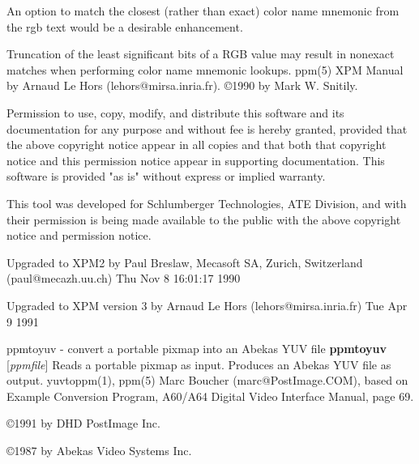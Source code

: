 An option to match the closest (rather than exact) color name mnemonic
from the rgb text would be a desirable enhancement.
\par
Truncation of the least significant bits of a RGB value may result in
nonexact matches when performing color name mnemonic lookups.
ppm(5)
\nwl
XPM Manual by Arnaud Le Hors (lehors@mirsa.inria.fr).
\copyright 1990 by Mark W. Snitily.

Permission to use, copy, modify, and distribute this software and its
documentation for any purpose and without fee is hereby granted, provided
that the above copyright notice appear in all copies and that both that
copyright notice and this permission notice appear in supporting
documentation.  This software is provided "as is" without express or
implied warranty.

This tool was developed for Schlumberger Technologies, ATE Division, and
with their permission is being made available to the public with the above
copyright notice and permission notice.

Upgraded to XPM2 by
   Paul Breslaw, Mecasoft SA, Zurich, Switzerland (paul@mecazh.uu.ch)
   Thu Nov  8 16:01:17 1990

Upgraded to XPM version 3 by
   Arnaud Le Hors (lehors@mirsa.inria.fr)
   Tue Apr 9 1991


%
 
%

\newpage
%

ppmtoyuv - convert a portable pixmap into an Abekas YUV file
{\bf ppmtoyuv}
{\rm [}{\it ppmfile}{\rm ]}
Reads a portable pixmap as input.
Produces an Abekas YUV file as output.
yuvtoppm(1), ppm(5)
Marc Boucher (marc@PostImage.COM),
based on Example Conversion Program, A60/A64 Digital Video Interface
Manual, page 69.
\par
\copyright 1991 by DHD PostImage Inc.
\par
\copyright 1987 by Abekas Video Systems Inc.
%
 

